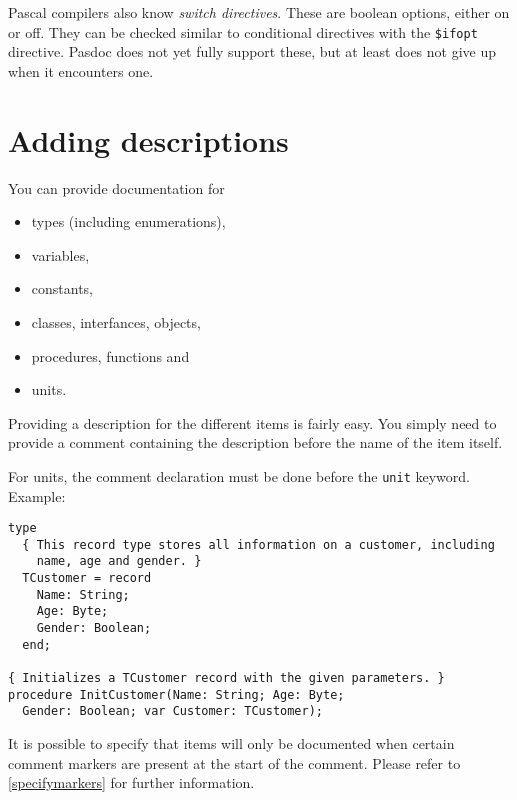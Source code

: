 \documentclass[11pt]{article}
\begin{document}
Pascal compilers also know \emph{switch directives}.
These are boolean options, either on or off.
They can be checked similar to conditional directives with
the {\tt \$ifopt} directive.
Pasdoc does not yet fully support these, but at least does not give
up when it encounters one.

\section{Adding descriptions}

You can provide documentation for

\begin{itemize}
\item types (including enumerations),
\item variables,
\item constants,
\item classes, interfances, objects,
\item procedures, functions and
\item units.
\end{itemize}

Providing a description for the different items is fairly easy. You simply
need to provide a comment containing the description before the name of
the item itself. 

For units, the comment declaration must be done before the {\tt unit} keyword. 
Example:
\begin{verbatim}
type
  { This record type stores all information on a customer, including
    name, age and gender. }
  TCustomer = record
    Name: String;
    Age: Byte;
    Gender: Boolean;
  end;

{ Initializes a TCustomer record with the given parameters. }
procedure InitCustomer(Name: String; Age: Byte;
  Gender: Boolean; var Customer: TCustomer);
\end{verbatim}

It is possible to specify that items will only be documented when certain
comment markers are present at the start of the comment. Please refer
to \ref{specifymarkers} for further information.
\end{document}
